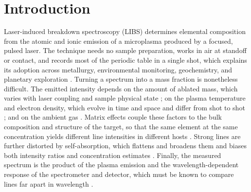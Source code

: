 \section{Introduction}
\label{sec:intro}

Laser-induced breakdown spectroscopy (LIBS) determines elemental composition from the atomic and ionic emission of a microplasma produced by a focused, pulsed laser.
The technique needs no sample preparation, works in air at standoff or contact, and records most of the periodic table in a single shot, which explains its adoption across metallurgy, environmental monitoring, geochemistry, and planetary exploration \citep{hahn2010review1,hahn2012libs,fortes2013libs,cremers2013handbook}.
Turning a spectrum into a mass fraction is nonetheless difficult.
The emitted intensity depends on the amount of ablated mass, which varies with laser coupling and sample physical state \citep{russo2013ablation}; on the plasma temperature and electron density, which evolve in time and space and differ from shot to shot \citep{aguilera2004spatial,borduchi2022detection}; and on the ambient gas \citep{palasti2022argon}.
Matrix effects couple these factors to the bulk composition and structure of the target, so that the same element at the same concentration yields different line intensities in different hosts \citep{eppler1996matrix,takahashi2017matrix}.
Strong lines are further distorted by self-absorption, which flattens and broadens them and biases both intensity ratios and concentration estimates \citep{bulajic2002selfabsorption,palleschi2022selfabsorption}.
Finally, the measured spectrum is the product of the plasma emission and the wavelength-dependent response of the spectrometer and detector, which must be known to compare lines far apart in wavelength \citep{li2014spectralresponse}.

